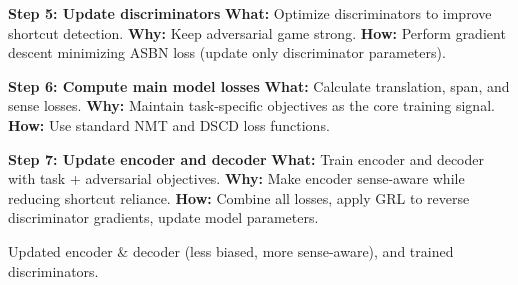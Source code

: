 \documentclass[11pt]{article}
\begin{document}
\begin{algorithm}[H]
\begin{algorithmic}[1]
\State \textbf{Step 5: Update discriminators} 
\State \hspace{0.5cm} \textbf{What:} Optimize discriminators to improve shortcut detection. 
\State \hspace{0.5cm} \textbf{Why:} Keep adversarial game strong. 
\State \hspace{0.5cm} \textbf{How:} Perform gradient descent minimizing ASBN loss (update only discriminator parameters).

\State \textbf{Step 6: Compute main model losses} 
\State \hspace{0.5cm} \textbf{What:} Calculate translation, span, and sense losses. 
\State \hspace{0.5cm} \textbf{Why:} Maintain task-specific objectives as the core training signal. 
\State \hspace{0.5cm} \textbf{How:} Use standard NMT and DSCD loss functions.

\State \textbf{Step 7: Update encoder and decoder} 
\State \hspace{0.5cm} \textbf{What:} Train encoder and decoder with task + adversarial objectives. 
\State \hspace{0.5cm} \textbf{Why:} Make encoder sense-aware while reducing shortcut reliance. 
\State \hspace{0.5cm} \textbf{How:} Combine all losses, apply GRL to reverse discriminator gradients, update model parameters.

\Ensure Updated encoder \& decoder (less biased, more sense-aware), and trained discriminators.

\end{algorithmic}
\end{algorithm}
\end{document}

